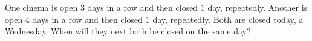 One cinema is open $3$ days in a row and then closed $1$ day, repeatedly. Another is open $4$ days in a row and then closed $1$ day, repeatedly. Both are closed today, a Wednesday. When will they next both be closed on the same day?
